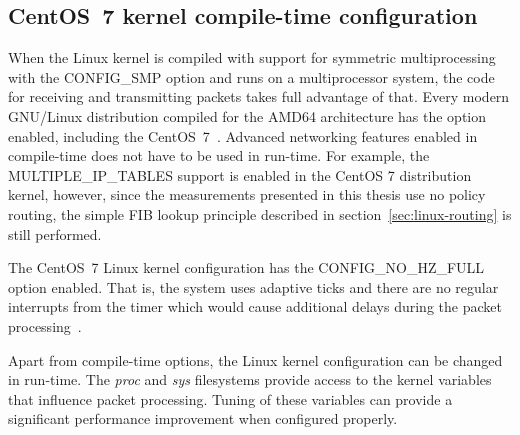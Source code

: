 
\subsection{CentOS~7 kernel compile-time configuration}
When the Linux kernel is compiled with support for symmetric multiprocessing
with the CONFIG\_SMP option and runs on a multiprocessor system, the code for receiving and
transmitting packets takes full advantage of that.
Every modern GNU/Linux distribution compiled for the AMD64 architecture has the option enabled,
including the CentOS~7~\cite{understanding-internals}.
Advanced networking features enabled in compile-time
does not have to be used in run-time.
For example, the MULTIPLE\_IP\_TABLES support is enabled in the CentOS 7 distribution kernel, however,
since the measurements presented in this thesis use no policy routing,
the simple FIB lookup principle described in section~\ref{sec:linux-routing} is still performed.

The CentOS~7 Linux kernel configuration has the CONFIG\_NO\_HZ\_FULL option enabled.
That is, the system uses adaptive ticks
and there are no regular interrupts from the timer
which would cause additional delays during the packet processing~\cite{kernel-doc-nohz}.

Apart from compile-time options, the Linux kernel configuration can be changed in run-time.
The {\it{proc}} and {\it{sys}} filesystems provide access to the kernel variables that influence packet processing.
Tuning of these variables can provide a significant performance improvement when configured properly.
